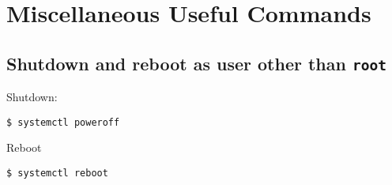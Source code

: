 \documentclass[12pt,letterpaper]{article}
\begin{document}
\section{Miscellaneous Useful Commands}

\subsection{Shutdown and reboot as user other than \lstinline{root}}
Shutdown:
\begin{lstlisting}
$ systemctl poweroff
\end{lstlisting}

Reboot
\begin{lstlisting}
$ systemctl reboot
\end{lstlisting}
\end{document}
